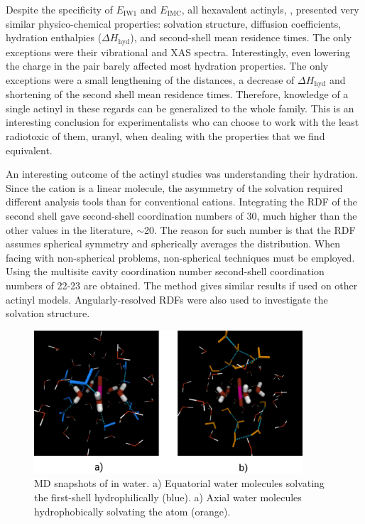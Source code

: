 Despite the 
specificity of $E_\text{IW1}$ and 
$E_\text{IMC}$, all hexavalent actinyls, 
\newline{}, presented very similar physico-chemical properties: solvation 
structure, diffusion coefficients, hydration enthalpies ($\Delta H_\text{hyd}$), and second-shell 
mean 
residence times. The only exceptions were their vibrational and XAS spectra. 
Interestingly, 
even lowering the charge in the  pair barely affected most hydration properties. 
The only exceptions were a small lengthening of the distances, a decrease of $\Delta 
H_\text{hyd}$ and shortening of the second shell mean residence times. Therefore, knowledge of a 
single actinyl in 
these regards can be generalized to the whole family. This is an interesting conclusion for 
experimentalists who can choose to work with the least radiotoxic of them, uranyl, when 
dealing with the properties that we find equivalent. 

An interesting outcome of the actinyl studies was understanding their hydration. Since the cation 
is a linear molecule, the asymmetry of the solvation required different analysis tools than for
conventional cations. Integrating the RDF of the second shell gave second-shell coordination 
numbers of 30, much higher than the other values in the literature, $\sim$20. The 
reason for such number is that the RDF assumes spherical symmetry and spherically averages the 
distribution. When 
facing with non-spherical problems, non-spherical techniques must be employed. Using the 
multisite cavity coordination number\cite{JChemTheoComp_ESM_2013} second-shell coordination 
numbers of 22-23 are obtained. The method gives similar results if used on other actinyl models. 
Angularly-resolved RDFs were also used to investigate the solvation structure. 



\begin{figure}
\centering 
\includegraphics[width=10cm]{./images/An_VI_solvation.pdf}
\caption[Snapshots of  solvation]{MD snapshots of
 in water. a) Equatorial water molecules solvating the first-shell 
hydrophilically (blue). a) Axial water molecules hydrophobically solvating the \oyl 
atom (orange). }
\label{ActinylSolvation}
\end{figure}


